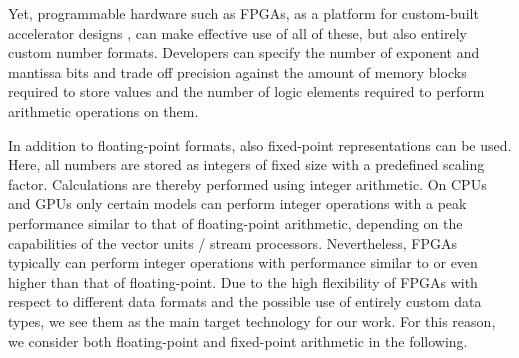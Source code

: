 \documentclass[format=acmsmall,review,timestamp,urlbreakonhyphens]{acmart}
\begin{document}

Yet, programmable hardware such as FPGAs, as a platform for custom-built accelerator designs \cite{Strzodka2006, KenterVector, KenterPragma}, can make effective use of all of these, but also entirely custom number formats.
Developers can specify the number of exponent and mantissa bits and trade off precision against the amount of memory blocks required to store values and the number of logic elements required to perform arithmetic operations on them.

In addition to floating-point formats, also fixed-point representations can be used. Here, all numbers are stored as integers of fixed size with a
predefined scaling factor. Calculations are thereby performed using integer arithmetic. On CPUs and GPUs only certain models can perform integer operations with a peak performance similar to that of floating-point arithmetic, depending on the capabilities of the vector units / stream processors. Nevertheless, FPGAs typically can perform integer operations with performance similar to or even higher than that of floating-point. Due to the high flexibility of FPGAs with respect to different data formats and the possible use of entirely custom data types, we see them as the main target technology for our work. For this reason, we consider both floating-point and fixed-point arithmetic in the following.

\end{document}
